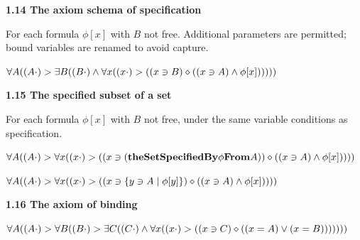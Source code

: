 \documentclass{article}
\begin{document}
\par\bigskip{}\label{theAxiomSchemaOfSpecification}
\noindent\textbf{1.14 The axiom schema of specification}\par\smallskip
For each formula $\phi[x]$ with $B$ not free. Additional parameters are permitted; bound variables are renamed to avoid capture.

\noindent\(\displaystyle \forall A((A\mathbin{\cdot})>\exists B((B\mathbin{\cdot})\land\forall x((x\mathbin{\cdot})>((x\owns B)\diamond((x\owns A)\land\phi[x])))))\)\par

\par\bigskip{}\label{theSpecifiedSubsetOfASet}
\noindent\textbf{1.15 The specified subset of a set}\par\smallskip
For each formula $\phi[x]$ with $B$ not free, under the same variable conditions as specification.

\begingroup\small
\begin{fitchproof}

\end{fitchproof}
\endgroup

\noindent\(\displaystyle \forall A((A\mathbin{\cdot})>\forall x((x\mathbin{\cdot})>((x\owns(\mathbf{theSetSpecifiedBy} \phi\mathbf{From} A))\diamond((x\owns A)\land\phi[x]))))\)\par
\noindent\(\displaystyle \forall A((A\mathbin{\cdot})>\forall x((x\mathbin{\cdot})>((x\owns\{y\owns A\mid\phi[y]\})\diamond((x\owns A)\land\phi[x]))))\)\par

\par\bigskip{}\label{theAxiomOfBinding}
\noindent\textbf{1.16 The axiom of binding}\par\smallskip
\noindent\(\displaystyle \forall A((A\mathbin{\cdot})>\forall B((B\mathbin{\cdot})>\exists C((C\mathbin{\cdot})\land\forall x((x\mathbin{\cdot})>((x\owns C)\diamond((x=A)\lor(x=B)))))))\)\par
\end{document}
